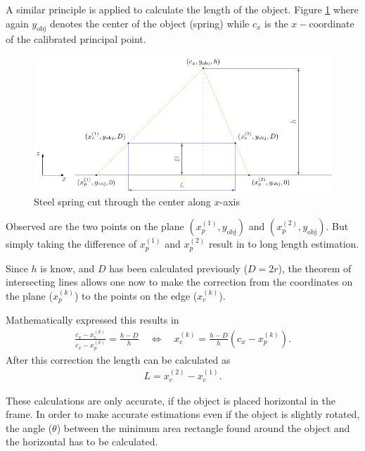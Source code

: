A similar principle is applied to calculate the length of the object.
Figure \ref{development:length} where again
$y_{\text{obj}}$ denotes the center of the object (spring) while $c_x$ is the $x-$coordinate of the calibrated principal point.
\begin{figure}[ht]
	\centering
	\includegraphics[width=0.9\linewidth]{3-development/software/images/length_estimation.pdf}
	\caption{Steel spring cut through the center along $x$-axis\label{development:length}}
\end{figure}
Observed are the two points on the plane $(x_p^{(1)}, y_{\text{obj}})$ and $(x_p^{(2)}, y_{\text{obj}})$.
But simply taking the difference of $x_p^{(1)}$ and $x_p^{(2)}$ result in to long length estimation.

Since $h$ is know, and $D$ has been calculated previously ($D=2r$), the theorem of intersecting lines allows one now to make the correction from the coordinates on the plane ($x_p^{(k)}$) to the points on the edge ($x_c^{(k)}$).

Mathematically expressed this results in
\begin{align*}
	\frac{c_x-x_c^{(k)}}{c_x-x_p^{(k)}}=\frac{h-D}{h}\quad\Leftrightarrow\quad
	x_c^{(k)}=\frac{h-D}{h}(c_x-x_p^{(k)}).
\end{align*}
After this correction the length can be calculated as
\begin{align*}
	L=x_c^{(2)}-x_c^{(1)}.
\end{align*}

These calculations are only accurate, if the object is placed horizontal in the frame.
In order to make accurate estimations even if the object is slightly rotated, the angle ($\theta$) between the minimum area rectangle found around the object and the horizontal has to be calculated.

